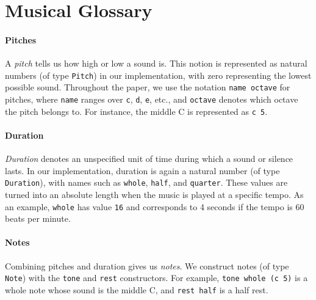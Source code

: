 \section{Musical Glossary}
\label{sec:music}

\paragraph{Pitches}
A \emph{pitch} tells us how high or low a sound is.
This notion is represented as natural numbers (of type
\texttt{Pitch}) in our implementation, with zero representing the
lowest possible sound.
Throughout the paper, we use the notation \texttt{name octave}
for pitches, where \texttt{name} ranges over \texttt{c}, \texttt{d},
\texttt{e}, etc., and \texttt{octave} denotes which octave the pitch
belongs to.
For instance, the middle C is represented as \texttt{c 5}.




\paragraph{Duration}
\emph{Duration} denotes an unspecified unit of time during which
a sound or silence lasts.
In our implementation, duration is again a natural number (of type
\texttt{Duration}), with names such as \texttt{whole}, \texttt{half},
and \texttt{quarter}.
These values are turned into an absolute length when the music is
played at a specific tempo.
As an example, \texttt{whole} has value \texttt{16} and corresponds
to 4 seconds if the tempo is 60 beats per minute.


\paragraph{Notes}
Combining pitches and duration gives us \emph{notes}.
We construct notes (of type \texttt{Note}) with the \texttt{tone}
and \texttt{rest} constructors.
For example, \texttt{tone whole (c 5)} is a whole note whose
sound is the middle C, and \texttt{rest half} is a half rest.

